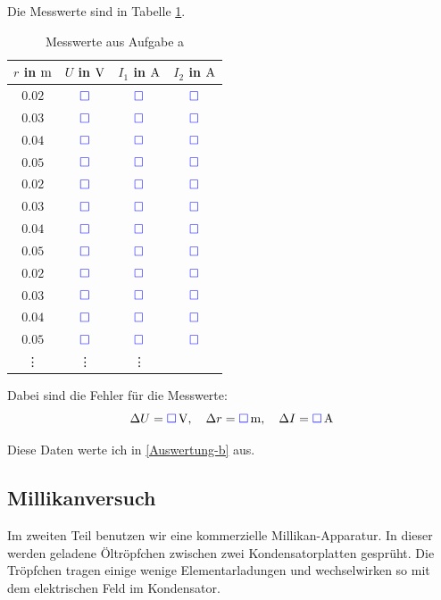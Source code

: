 \documentclass[11pt]{article}
\newcommand{\messwert}{\textcolor{blue}{\square}}
\begin{document}
Die Messwerte sind in Tabelle \ref{table:Aufgabe-a}.

\begin{table}[H]
	\centering

	\begin{tabular}{cccc}
		$r$ in $\unit m$ & $U$ in $\unit V$ & $I_1$ in $\unit A$ & $I_2$ in $\unit A$ \\
		\hline
		$0.02$ & $\messwert$ & $\messwert$ & $\messwert$ \\
		$0.03$ & $\messwert$ & $\messwert$ & $\messwert$ \\
		$0.04$ & $\messwert$ & $\messwert$ & $\messwert$ \\
		$0.05$ & $\messwert$ & $\messwert$ & $\messwert$ \\
		\hline
		$0.02$ & $\messwert$ & $\messwert$ & $\messwert$ \\
		$0.03$ & $\messwert$ & $\messwert$ & $\messwert$ \\
		$0.04$ & $\messwert$ & $\messwert$ & $\messwert$ \\
		$0.05$ & $\messwert$ & $\messwert$ & $\messwert$ \\
		\hline
		$0.02$ & $\messwert$ & $\messwert$ & $\messwert$ \\
		$0.03$ & $\messwert$ & $\messwert$ & $\messwert$ \\
		$0.04$ & $\messwert$ & $\messwert$ & $\messwert$ \\
		$0.05$ & $\messwert$ & $\messwert$ & $\messwert$ \\
		\hline
		   \vdots & \vdots & \vdots
	\end{tabular}

	\caption{Messwerte aus Aufgabe a}
	\label{table:Aufgabe-a}
\end{table}

Dabei sind die Fehler für die Messwerte:
\[
	\Delta U = \unit[\messwert] V,
	\quad
	\Delta r = \unit[\messwert] m,
	\quad
	\Delta I = \unit[\messwert] A
\]

Diese Daten werte ich in \ref{Auswertung-b} aus.

\subsection{Millikanversuch}

Im zweiten Teil benutzen wir eine kommerzielle Millikan-Apparatur. In dieser
werden geladene Öltröpfchen zwischen zwei Kondensatorplatten gesprüht. Die
Tröpfchen tragen einige wenige Elementarladungen und wechselwirken so mit dem
elektrischen Feld im Kondensator.
\end{document}
